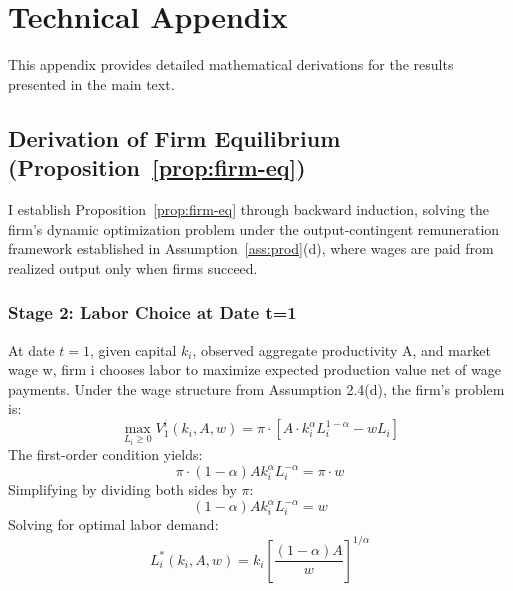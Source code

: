 \documentclass[12pt]{article}
\begin{document}
\section{Technical Appendix}
\label{app:tech}

This appendix provides detailed mathematical derivations for the results presented in the main text.

\subsection{Derivation of Firm Equilibrium (Proposition~\ref{prop:firm-eq})}
\label{app:deriv-firm}
I establish Proposition~\ref{prop:firm-eq} through backward induction, solving the firm's dynamic optimization problem under the output-contingent remuneration framework established in Assumption~\ref{ass:prod}(d), where wages are paid from realized output only when firms succeed.

\subsubsection{Stage 2: Labor Choice at Date t=1}
At date $t=1$, given capital $k_{i}$, observed aggregate productivity A, and market wage w, firm i chooses labor to maximize expected production value net of wage payments. Under the wage structure from Assumption 2.4(d), the firm's problem is:
\begin{equation}
\max_{L_{i} \ge 0} V_{1}^{i}(k_{i},A,w) = \pi \cdot [A \cdot k_{i}^{\alpha}L_{i}^{1-\alpha} - wL_{i}]
\end{equation}
The first-order condition yields:
\begin{equation}
\pi \cdot (1-\alpha)Ak_{i}^{\alpha}L_{i}^{-\alpha} = \pi \cdot w
\end{equation}
Simplifying by dividing both sides by $\pi$:
\begin{equation}
(1-\alpha)Ak_{i}^{\alpha}L_{i}^{-\alpha} = w
\end{equation}
Solving for optimal labor demand:
\begin{equation}
L_{i}^{*}(k_{i},A,w) = k_{i}\left[\frac{(1-\alpha)A}{w}\right]^{1/\alpha}
\end{equation}
\end{document}

